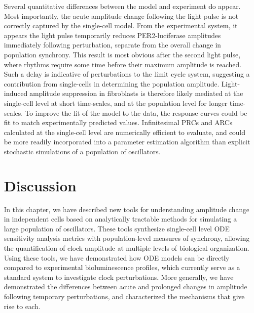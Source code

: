 Several quantitative differences between the model and experiment do appear.
Most importantly, the acute amplitude change following the light pulse is not correctly captured by the single-cell model.
From the experimental system, it appears the light pulse temporarily reduces PER2-luciferase amplitudes immediately following perturbation, separate from the overall change in population synchrony.
This result is most obvious after the second light pulse, where rhythms require some time before their maximum amplitude is reached.
Such a delay is indicative of perturbations to the limit cycle system, suggesting a contribution from single-cells in determining the population amplitude.
Light-induced amplitude suppression in fibroblasts is therefore likely mediated at the single-cell level at short time-scales, and at the population level for longer time-scales.
To improve the fit of the model to the data, the response curves could be fit to match experimentally predicted values.
Infinitesimal PRCs and ARCs calculated at the single-cell level are numerically efficient to evaluate, and could be more readily incorporated into a parameter estimation algorithm than explicit stochastic simulations of a population of oscillators.

\section{Discussion}

In this chapter, we have described new tools for understanding amplitude change in independent cells based on analytically tractable methods for simulating a large population of oscillators.
These tools synthesize single-cell level ODE sensitivity analysis metrics with population-level measures of synchrony, allowing the quantification of clock amplitude at multiple levels of biological organization.
Using these tools, we have demonstrated how ODE models can be directly compared to experimental bioluminescence profiles, which currently serve as a standard system to investigate clock perturbations.
More generally, we have demonstrated the differences between acute and prolonged changes in amplitude following temporary perturbations, and characterized the mechanisms that give rise to each.


